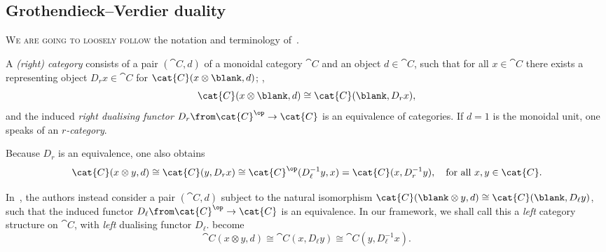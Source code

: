\subsection{Grothendieck–Verdier duality}

\textsc{We are going to loosely follow}
the notation and terminology of~\cite{boyarchenko13:groth-verdier}.

\begin{definition}\label{def:*-autonomous-drinfeld}
  A \emph{(right) \GV{} category} consists of a pair \((\cat{C}, d)\) of a monoidal category \(\cat{C}\) and an
  object \(d\in \cat{C}\),
  such that for all \(x\in\cat{C}\) there exists a representing object \(D_r x \in \cat{C}\) for \(\cat{C}(x \otimes \blank, d)\);
  \ie,
  \begin{equation}\label{eq:*-aut-condition}
    \cat{C}(x \otimes \blank ,d) \cong \cat{C}(\blank, D_{r} x),
  \end{equation}
  and the induced \emph{right dualising functor} \(D_r\from \cat{C}^{\op}\to\cat{C}\) is an equivalence of categories.
  If \(d=1\) is the monoidal unit, one speaks of an \emph{\(r\)\hyp{}category}.
\end{definition}

Because \(D_r\) is an equivalence,
one also obtains
\begin{equation}\label{eq:gv-inverse-condition}
  \cat{C}(x \otimes y, d) \cong \cat{C}(y, D_r x) \cong \cat{C}^{\op}(D^{-1}_{\ell}y, x) = \cat{C}(x, D_r^{-1} y),
  \quad \text{for all } x, y \in \cat{C}.
\end{equation}

\begin{remark}\label{rmk:right-gv-vs-the-world}
  In~\cite{boyarchenko13:groth-verdier}, the authors instead consider
  a pair \((\cat{C}, d)\)
  subject to the natural isomorphism \(\cat{C}(\blank \otimes y, d) \cong \cat{C}(\blank, D_{\ell} y)\),
  such that the induced functor \(D_{\ell}\from \cat{C}^{\op} \to \cat{C}\) is an equivalence.
  In our framework, we shall call this a \emph{left} \GV{} category structure on \(\cat{C}\),
  with \emph{left} dualising functor \(D_{\ell}\).
   become
  \begin{equation}\label{eq:left-gv-condition-and-inverse}
    \cat{C}(x \otimes y, d) \cong \cat{C}(x, D_{\ell}y) \cong \cat{C}(y, D^{-1}_{\ell}x).
  \end{equation}
\end{remark}


